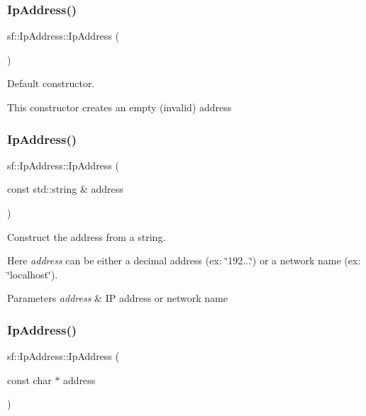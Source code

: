 \subsubsection{\texorpdfstring{Ip\+Address()}{IpAddress()}\hspace{0.1cm}{\footnotesize\ttfamily [1/5]}}
{\footnotesize\ttfamily sf\+::\+Ip\+Address\+::\+Ip\+Address (\begin{DoxyParamCaption}{ }\end{DoxyParamCaption})}



Default constructor. 

This constructor creates an empty (invalid) address \mbox{\label{classsf_1_1_ip_address_a656b7445ab04cabaa7398685bc09c3f7}} 
\subsubsection{\texorpdfstring{Ip\+Address()}{IpAddress()}\hspace{0.1cm}{\footnotesize\ttfamily [2/5]}}
{\footnotesize\ttfamily sf\+::\+Ip\+Address\+::\+Ip\+Address (\begin{DoxyParamCaption}\item[{const std\+::string \&}]{address }\end{DoxyParamCaption})}



Construct the address from a string. 

Here {\itshape address} can be either a decimal address (ex\+: \char`\"{}192...\char`\"{}) or a network name (ex\+: \char`\"{}localhost\char`\"{}).


\begin{DoxyParams}{Parameters}
{\em address} & IP address or network name \\
\hline
\end{DoxyParams}
\mbox{\label{classsf_1_1_ip_address_a92f2a9be74334a61b96c2fc79fe6eb78}} 
\subsubsection{\texorpdfstring{Ip\+Address()}{IpAddress()}\hspace{0.1cm}{\footnotesize\ttfamily [3/5]}}
{\footnotesize\ttfamily sf\+::\+Ip\+Address\+::\+Ip\+Address (\begin{DoxyParamCaption}\item[{const char $\ast$}]{address }\end{DoxyParamCaption})}



